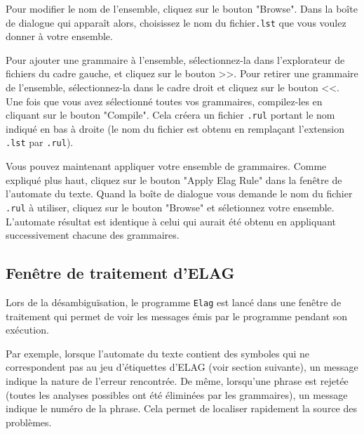 \bigskip
\noindent Pour modifier le nom de l’ensemble, cliquez sur le bouton "Browse".
Dans la boîte de dialogue qui apparaît alors, choisissez le nom du fichier\verb+.lst+ que vous
voulez donner à votre ensemble.


\bigskip
\noindent Pour ajouter une grammaire à l’ensemble, sélectionnez-la dans l’explorateur de fichiers
du cadre gauche, et cliquez sur le bouton >>.
Pour retirer une grammaire de l’ensemble, sélectionnez-la dans le cadre droit et cliquez
sur le bouton <<.
Une fois que vous avez sélectionné toutes vos grammaires, compilez-les en cliquant sur
le bouton "Compile". Cela créera un fichier \verb+.rul+ portant le nom indiqué en bas à droite (le
	nom du fichier est obtenu en remplaçant l’extension \verb+.lst+ par \verb+.rul+).

\bigskip
\noindent Vous pouvez maintenant appliquer votre ensemble de grammaires. Comme expliqué
plus haut, cliquez sur le bouton "Apply Elag Rule" dans la fenêtre de l’automate du texte. Quand la boîte de dialogue vous demande le nom du fichier \verb+.rul+ à utiliser, cliquez sur le bouton "Browse" et séletionnez votre ensemble. L’automate résultat est identique à celui qui aurait été obtenu en appliquant successivement chacune des grammaires.

\subsection{Fenêtre de traitement d’ELAG}
Lors de la désambiguïsation, le programme \verb+Elag+ 
 est lancé dans une fenêtre de traitement qui permet
de voir les messages émis par le programme pendant son exécution.


\bigskip
\noindent Par exemple, lorsque l’automate du texte contient des symboles qui ne correspondent
pas au jeu d’étiquettes d’ELAG (voir section suivante), un message indique la nature de l’erreur
rencontrée. De même, lorsqu’une phrase est rejetée (toutes les analyses possibles
ont été éliminées par les grammaires), un message indique le numéro de la phrase. Cela
permet de localiser rapidement la source des problèmes.


